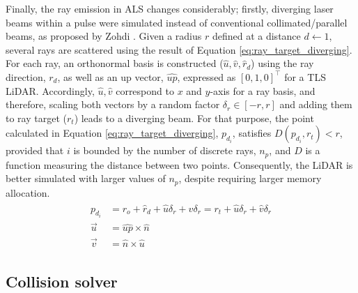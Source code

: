 Finally, the ray emission in ALS changes considerably; firstly, diverging laser beams within a pulse were simulated instead of conventional collimated/parallel beams, as proposed by Zohdi \cite{zohdi_rapid_2020}. Given a radius $r$ defined at a distance $d \gets 1$, several rays are scattered using the result of Equation \ref{eq:ray_target_diverging}. For each ray, an orthonormal basis is constructed ($\hat{u}, \hat{v}, \hat{r}_{d}$) using the ray direction, $r_{d}$, as well as an up vector, $\hat{\textit{up}}$, expressed as $\left[0, 1, 0\right]^\intercal$ for a TLS LiDAR. Accordingly, $\hat{u}, \hat{v}$ correspond to $x$ and $y$-axis for a ray basis, and therefore, scaling both vectors by a random factor $\delta_{r} \in [-r, r]$ and adding them to ray target ($r_{t}$) leads to a diverging beam. For that purpose, the point calculated in Equation \ref{eq:ray_target_diverging}, $p_{d_{i}}$, satisfies $D(p_{d_{i}}, r_{t}) < r$, provided that $i$ is bounded by the number of discrete rays, $n_{p}$, and $D$ is a function measuring the distance between two points. Consequently, the LiDAR is better simulated with larger values of $n_{p}$, despite requiring larger memory allocation.
\begin{gather}
    \label{eq:ray_target_diverging}
    \begin{aligned}
        p_{d_{i}} &= r_{o} + \hat{r}_{d} + \hat{u}\delta_{r} + \hat{v}\delta_{r} = r_{t} + \hat{u}\delta_{r} + \hat{v}\delta_{r}\\
        \vec{u} &= \hat{\textit{up}} \times \hat{n}\\
        \vec{v} &= \hat{n} \times \hat{u}
    \end{aligned}
\end{gather}

\subsection{Collision solver}

